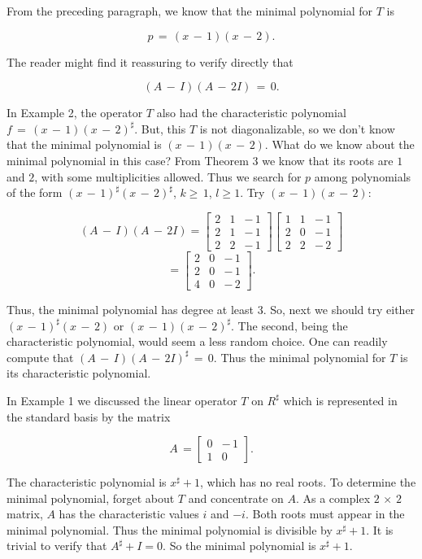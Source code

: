 From the preceding paragraph, we know that the minimal polynomial for \(T\) is

\[p\,=\,(x\,-\,1)(x\,-\,2).\]

The reader might find it reassuring to verify directly that

\[(A\,-\,I)(A\,-\,2I)\,=\,0.\]

In Example 2, the operator \(T\) also had the characteristic polynomial \(f\,=\,(x\,-\,1)(x\,-\,2)^{\sharp}\). But, this \(T\) is not diagonalizable, so we don't know that the minimal polynomial is \((x\,-\,1)\)\((x\,-\,2)\). What do we know about the minimal polynomial in this case? From Theorem 3 we know that its roots are \(1\) and \(2\), with some multiplicities allowed. Thus we search for \(p\) among polynomials of the form \((x\,-\,1)^{\sharp}(x\,-\,2)^{\sharp}\), \(k\geq\,1\), \(l\geq 1\). Try \((x\,-\,1)\)\((x\,-\,2)\):

\[(A\,-\,I)(A\,-\,2I) = \begin{bmatrix}2&1&-\,1\\ 2&1&-\,1\\ 2&2&-\,1\end{bmatrix}\begin{bmatrix}1&1&-\,1\\ 2&0&-\,1\\ 2&2&-\,2\end{bmatrix}\] \[= \begin{bmatrix}2&0&-\,1\\ 2&0&-\,1\\ 4&0&-\,2\end{bmatrix}.\]

Thus, the minimal polynomial has degree at least \(3\). So, next we should try either \((x\,-\,1)^{\sharp}(x\,-\,2)\) or \((x\,-\,1)(x\,-\,2)^{\sharp}\). The second, being the characteristic polynomial, would seem a less random choice. One can readily compute that \((A\,-\,I)(A\,-\,2I)^{\sharp}\,=\,0\). Thus the minimal polynomial for \(T\) is its characteristic polynomial.

In Example 1 we discussed the linear operator \(T\) on \(R^{\sharp}\) which is represented in the standard basis by the matrix

\[A\,=\begin{bmatrix}0&-\,1\\ 1&0\end{bmatrix}.\]

The characteristic polynomial is \(x^{\sharp}+1\), which has no real roots. To determine the minimal polynomial, forget about \(T\) and concentrate on \(A\). As a complex \(2\,\times\,2\) matrix, \(A\) has the characteristic values \(i\) and \(-i\). Both roots must appear in the minimal polynomial. Thus the minimal polynomial is divisible by \(x^{\sharp}+1\). It is trivial to verify that \(A^{\sharp}+I=0\). So the minimal polynomial is \(x^{\sharp}+1\).

